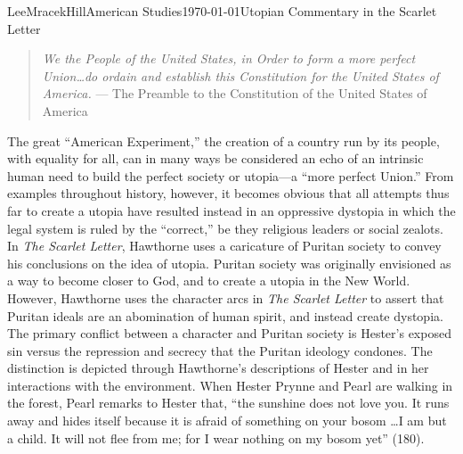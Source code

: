 \documentclass[12pt, letterpaper]{article}
\begin{document}
\begin{mla}{Lee}{Mracek}{Hill}{American Studies}{\today}{Utopian Commentary in the Scarlet Letter}
\begin{quotation}
\textit{We the People of the United States, in Order to form a more perfect Union\ldots do ordain and establish this Constitution for the United States of America.} --- The Preamble to the Constitution of the United States of America
\end{quotation}
The great ``American Experiment,'' the creation of a country run by its people, with equality for all, can in many ways be considered an echo of an intrinsic human need to build the perfect society or utopia---a ``more perfect Union.'' From examples throughout history, however, it becomes obvious that all attempts thus far to create a utopia have resulted instead in an oppressive dystopia in which the legal system is ruled by the ``correct,'' be they religious leaders or social zealots. In \textit{The Scarlet Letter}, Hawthorne uses a caricature of Puritan society to convey his conclusions on the idea of utopia. Puritan society was originally envisioned as a way to become closer to God, and to create a utopia in the New World. However, Hawthorne uses the character arcs in \textit{The Scarlet Letter} to assert that Puritan ideals are an abomination of human spirit, and instead create dystopia. \\
        The primary conflict between a character and Puritan society is Hester's exposed sin versus the repression and secrecy that the Puritan ideology condones. The distinction is depicted through Hawthorne's descriptions of Hester and in her interactions with the environment. When Hester Prynne and Pearl are walking in the forest, Pearl remarks to Hester that, ``the sunshine does not love you. It runs away and hides itself because it is afraid of something on your bosom \ldots I am but a child. It will not flee from me; for I wear nothing on my bosom yet'' (180).

\end{mla}
\end{document}
